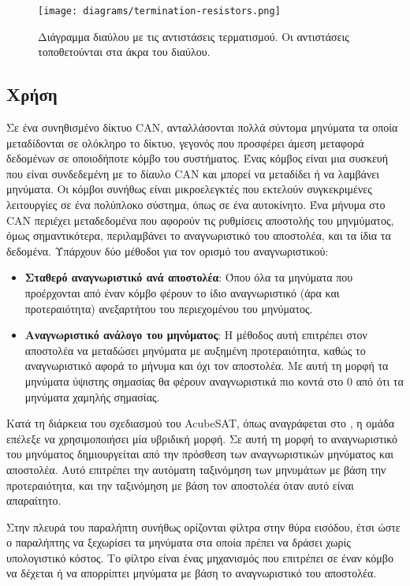 \documentclass[a4paper,nobib,justified]{tufte-book}
\begin{document}
\begin{figure}
	\texttt{[image: diagrams/termination-resistors.png]}
	\label{fig:termination-resistors}
	\caption[Διάγραμμα διαύλου με τις αντιστάσεις τερματισμού]{Διάγραμμα διαύλου με τις αντιστάσεις τερματισμού. Οι αντιστάσεις τοποθετούνται στα άκρα του διαύλου.}	
\end{figure}

\subsection{Χρήση}
\label{subsection:can-usage}
Σε ένα συνηθισμένο δίκτυο CAN, ανταλλάσονται πολλά σύντομα μηνύματα τα οποία μεταδίδονται σε ολόκληρο το δίκτυο, γεγονός που προσφέρει άμεση μεταφορά δεδομένων σε οποιοδήποτε κόμβο του συστήματος. Ένας κόμβος είναι μια συσκευή που είναι συνδεδεμένη με το δίαυλο CAN και μπορεί να μεταδίδει ή να λαμβάνει μηνύματα. Οι κόμβοι συνήθως είναι μικροελεγκτές που εκτελούν συγκεκριμένες λειτουργίες σε ένα πολύπλοκο σύστημα, όπως σε ένα αυτοκίνητο. Ένα μήνυμα στο CAN περιέχει μεταδεδομένα που αφορούν τις ρυθμίσεις αποστολής του μηνμύματος, όμως σημαντικότερα, περιλαμβάνει το αναγνωριστικό του αποστολέα, και τα ίδια τα δεδομένα. Υπάρχουν δύο μέθοδοι για τον ορισμό του αναγνωριστικού:

\begin{itemize}
	\item \textbf{Σταθερό αναγνωριστικό ανά αποστολέα}: Όπου όλα τα μηνύματα που προέρχονται από έναν κόμβο φέρουν το ίδιο αναγνωριστικό (άρα και προτεραιότητα) ανεξαρτήτου του περιεχομένου του μηνύματος.
	\item \textbf{Αναγνωριστικό ανάλογο του μηνύματος}: Η μέθοδος αυτή επιτρέπει στον αποστολέα να μεταδώσει μηνύματα με αυξημένη προτεραιότητα, καθώς το αναγνωριστικό αφορά το μήνυμα και όχι τον αποστολέα. Με αυτή τη μορφή τα μηνύματα ύψιστης σημασίας θα φέρουν αναγνωριστικά πιο κοντά στο 0 από ότι τα μηνύματα χαμηλής σημασίας.
\end{itemize}

Κατά τη διάρκεια του σχεδιασμού του AcubeSAT, όπως αναγράφεται στο , η ομάδα επέλεξε να χρησιμοποιήσει μία υβριδική μορφή. Σε αυτή τη μορφή το αναγνωριστικό του μηνύματος δημιουργείται από την πρόσθεση των αναγνωριστικών μηνύματος και αποστολέα. Αυτό επιτρέπει την αυτόματη ταξινόμηση των μηνυμάτων με βάση την προτεραιότητα, και την ταξινόμηση με βάση τον αποστολέα όταν αυτό είναι απαραίτητο.

Στην πλευρά του παραλήπτη συνήθως ορίζονται φίλτρα στην θύρα εισόδου, έτσι ώστε ο παραλήπτης να ξεχωρίσει τα μηνύματα στα οποία πρέπει να δράσει χωρίς υπολογιστικό κόστος. Το φίλτρο είναι ένας μηχανισμός που επιτρέπει σε έναν κόμβο να δέχεται ή να απορρίπτει μηνύματα με βάση το αναγνωριστικό του αποστολέα.
\end{document}
